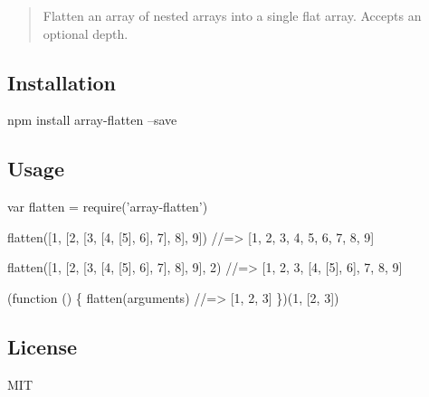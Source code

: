 \href{https://npmjs.org/package/array-flatten}{\tt } \href{https://npmjs.org/package/array-flatten}{\tt } \href{https://travis-ci.org/blakeembrey/array-flatten}{\tt } \href{https://coveralls.io/r/blakeembrey/array-flatten?branch=master}{\tt }

\begin{quote}
Flatten an array of nested arrays into a single flat array. Accepts an optional depth. \end{quote}


\subsection*{Installation}


\begin{DoxyCode}
npm install array-flatten --save
\end{DoxyCode}


\subsection*{Usage}


\begin{DoxyCode}
var flatten = require('array-flatten')

flatten([1, [2, [3, [4, [5], 6], 7], 8], 9])
//=> [1, 2, 3, 4, 5, 6, 7, 8, 9]

flatten([1, [2, [3, [4, [5], 6], 7], 8], 9], 2)
//=> [1, 2, 3, [4, [5], 6], 7, 8, 9]

(function () \{
  flatten(arguments) //=> [1, 2, 3]
\})(1, [2, 3])
\end{DoxyCode}


\subsection*{License}

M\+IT 